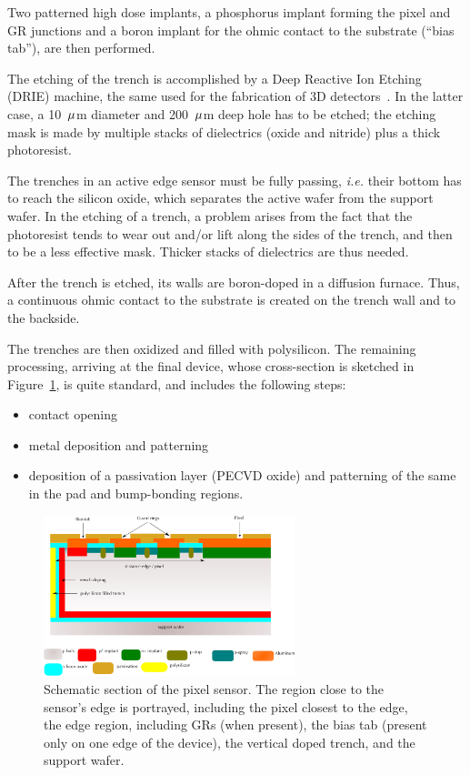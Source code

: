 Two patterned high dose implants, a  phosphorus implant forming the pixel and GR junctions  and a boron implant for  the ohmic contact
 to the substrate (``bias tab''), are then performed.

The etching of the trench is accomplished by a Deep Reactive Ion Etching (DRIE) machine, the same used for the fabrication of
3D detectors~\cite{bib:3DFBK}.
In the latter case, a 10~${\rm \mu}$m diameter and 200~${\rm \mu}$m deep hole has to be etched; the etching mask is made  by multiple stacks of dielectrics
 (oxide and nitride) plus a thick  photoresist.

The trenches in an active edge sensor must be fully passing, {\it i.e.} their bottom  has to reach  the silicon oxide, which separates the active wafer from the 
support wafer.
In the etching of a trench, a problem arises from the fact that the photoresist tends to wear out and/or lift along the sides  of the trench, and then to be
  a less effective mask. Thicker stacks of dielectrics are thus needed.

After the trench is etched, its walls are boron-doped in a diffusion furnace.
Thus, a continuous ohmic contact to the substrate  is created on the trench wall and to the backside.

The trenches are then oxidized and filled with polysilicon.
The remaining processing, arriving at the final device, whose cross-section is sketched in Figure~\ref{fig:pixel},
is quite standard, and includes the following steps:
\begin{itemize}
\item contact opening
\item metal deposition and patterning
\item deposition of a passivation layer  (PECVD  oxide)  and patterning of the same in the
 pad and bump-bonding regions.
\end{itemize}

\begin{figure}[!htpb]
\begin{center}
\includegraphics[width=0.65\textwidth]{pixel_design_v3.png}
\caption{\label{fig:pixel}Schematic section of the pixel sensor. The region close to the sensor's edge is portrayed, including the pixel closest to the edge,
the edge region, including GRs (when present), the bias tab (present only on one edge of the device), the vertical doped trench, and the support wafer.}
\end{center}
\end{figure}


